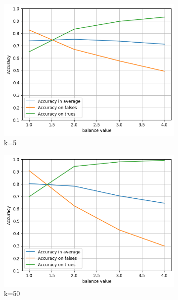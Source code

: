 \documentclass{article}
\begin{document}
\begin{figure}[H]
  \centering
  \begin{subfigure}[t]{0.33\textwidth}
    \centering
    \includegraphics[width=\linewidth]{balancek5.png}
    \caption{k=5}
  \end{subfigure}%
  \hfill
  \begin{subfigure}[t]{0.33\textwidth}
    \centering
    \includegraphics[width=\linewidth]{balancek50.png}
    \caption{k=50}
  \end{subfigure}
  \hfill
  \begin{subfigure}[t]{0.33\textwidth}
    \centering

\end{subfigure}
\end{figure}
\end{document}

